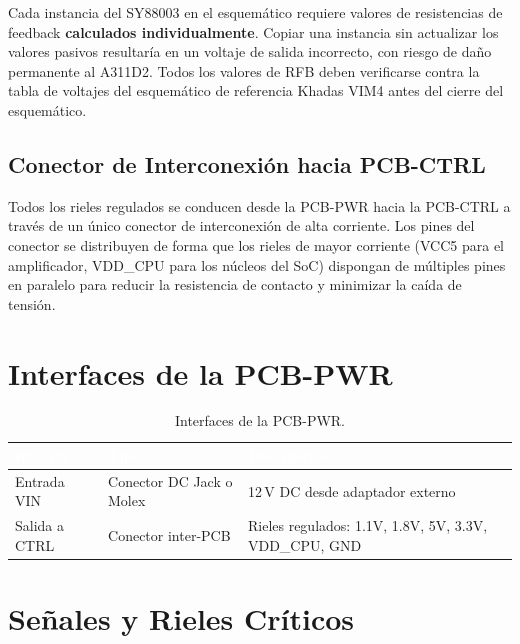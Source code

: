 \begin{riskbox}
  Cada instancia del SY88003 en el esquemático requiere valores de resistencias de
  feedback \textbf{calculados individualmente}. Copiar una instancia sin actualizar
  los valores pasivos resultaría en un voltaje de salida incorrecto, con riesgo de
  daño permanente al A311D2. Todos los valores de RFB deben verificarse contra la
  tabla de voltajes del esquemático de referencia Khadas VIM4 antes del cierre
  del esquemático.
\end{riskbox}

\subsection{Conector de Interconexión hacia PCB-CTRL}

Todos los rieles regulados se conducen desde la PCB-PWR hacia la PCB-CTRL a través
de un único conector de interconexión de alta corriente. Los pines del conector
se distribuyen de forma que los rieles de mayor corriente (VCC5 para el amplificador,
VDD\_CPU para los núcleos del SoC) dispongan de múltiples pines en paralelo para
reducir la resistencia de contacto y minimizar la caída de tensión.

\section{Interfaces de la PCB-PWR}
\label{sec:pwr_interfaces}

\begin{table}[H]
  \centering
  \caption{Interfaces de la PCB-PWR.}
  \label{tab:interfaces_pwr}
  \begin{tabularx}{\textwidth}{L{3cm} C{3cm} L{7cm}}
    \toprule
    \textcolor{white}{\textbf{Interfaz}} &
    \textcolor{white}{\textbf{Tipo}} &
    \textcolor{white}{\textbf{Descripción}} \\
    \midrule
    Entrada VIN    & Conector DC Jack o Molex & 12\,V DC desde adaptador externo \\
    Salida a CTRL  & Conector inter-PCB       & Rieles regulados: 1.1V, 1.8V, 5V, 3.3V, VDD\_CPU, GND \\
    \bottomrule
  \end{tabularx}
\end{table}

\section{Señales y Rieles Críticos}
\label{sec:pwr_senales}

